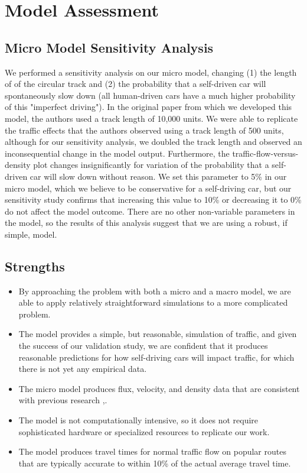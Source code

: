 \section{Model Assessment} \label{sec:model_assessment}

\subsection{Micro Model Sensitivity Analysis}
We performed a sensitivity analysis on our micro model, changing (1) the length of of the circular track and (2) the probability that a self-driven car will spontaneously slow down (all human-driven cars have a much higher probability of this "imperfect driving").  In the original paper from which we developed this model, the authors used a track length of 10,000 units.  We were able to replicate the traffic effects that the authors observed using a track length of 500 units, although for our sensitivity analysis, we doubled the track length and observed an inconsequential change in the model output.  Furthermore, the traffic-flow-versus-density plot changes insignificantly for variation of the probability that a self-driven car will slow down without reason.  We set this parameter to 5\% in our micro model, which we believe to be conservative for a self-driving car, but our sensitivity study confirms that increasing this value to 10\% or decreasing it to 0\% do not affect the model outcome.  There are no other non-variable parameters in the model, so the results of this analysis suggest that we are using a robust, if simple, model.

\subsection{Strengths}
    \begin{itemize}
        \item By approaching the problem with both a micro and a macro model, we are able to apply relatively straightforward simulations to a more complicated problem.
        \item The model provides a simple, but reasonable, simulation of traffic, and given the success of our validation study, we are confident that it produces reasonable predictions for how self-driving cars will impact traffic, for which there is not yet any empirical data.
        \item The micro model produces flux, velocity, and density data that are consistent with previous research \cite{Nagel1992ATraffic},\cite{Dym2004PrinciplesModeling}.
        \item The model is not computationally intensive, so it does not require sophisticated hardware or specialized resources to replicate our work.
        \item The model produces travel times for normal traffic flow on popular routes that are typically accurate to within 10\% of the actual average travel time.
    \end{itemize}
